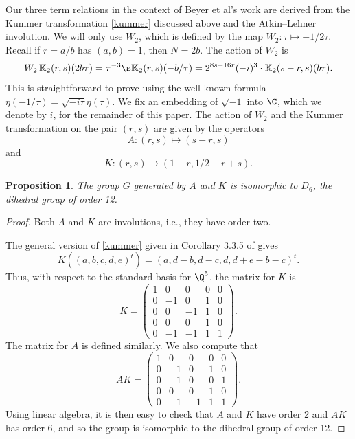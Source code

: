 \documentclass[12pt]{amsart}
\newtheorem{proposition}[theorem]{Proposition}
\theoremstyle{definition}
\theoremstyle{remark}
\begin{document}
Our three term relations in the context of Beyer et al's work are derived from the Kummer transformation \eqref{kummer} discussed above and the Atkin--Lehner involution. We will only use $W_2$, which is defined by the map $W_2:\tau\mapsto -1/2\tau$. Recall if $r=a/b$ has $(a,b)=1$, then $N=2b$. The action of $W_2$ is \begin{equation}\label{atkinlehner}
    W_2\,\mathbb{K}_2(r,s)(2b\tau)=\tau^{-3}\s \mathbb{K}_2(r,s)(-b/\tau)=2^{8s-16r}(-i)^3\cdot \mathbb{K}_2(s-r,s)(b\tau).
\end{equation} This is straightforward to prove using the well-known formula $\eta(-1/\tau)=\sqrt{-i\tau}\eta(\tau)$. We fix an embedding of $\sqrt{-1}$ into $\C$, which we denote by $i$, for the remainder of this paper. The action of $W_2$ and the Kummer transformation on the pair $(r,s)$
are given by the operators 
\begin{equation}\label{eq:A}
    A: (r,s)\mapsto (s-r,s)
\end{equation} and \begin{equation}\label{eq:K}
    K: (r,s)\mapsto (1-r,1/2-r+s).
\end{equation}   

\begin{proposition}\label{cox}
    The group $G$ generated by $A$ and $K$ is isomorphic to $D_6$, the dihedral group of order 12.
\end{proposition}
\begin{proof}
    Both $A$ and $K$ are involutions, i.e., they have order two. 

      The general version of \eqref{kummer} given in Corollary 3.3.5 of \cite{aar} gives $$K((a,b,c,d,e)^t)=(a,d-b,d-c,d,d+e-b-c)^t. $$ Thus, with respect to the standard basis for $\Q^5$, the matrix for $K$ is   
   $$K=\begin{pmatrix}
    1& 0& 0& 0& 0\\ 0& -1& 0& 1& 0\\ 0& 0& -1& 1& 0\\ 0& 0&
  0& 1& 0\\ 0& -1& -1& 1& 1
\end{pmatrix}.$$ The matrix for $A$ is defined similarly. We also compute that $$AK=\begin{pmatrix}
    1&0&0&0&0\\
    0&-1&0&1&0\\
    0&-1&0&0&1\\
    0&0&0&1&0\\
    0&-1&-1&1&1
\end{pmatrix}.$$ Using linear algebra, it is then easy to check that $A$ and $K$ have order 2 and $AK$ has order 6, and so the group is isomorphic to the dihedral group of order 12.
\end{proof} 
\end{document}

